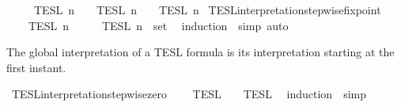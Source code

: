 \begin{isabellebody}
{\isacharbar}\ {\isacartoucheopen}{\isasymlbrakk}{\isasymlbrakk}\ {\isasymphi}\ {\isacharhash}\ {\isasymPhi}\ {\isasymrbrakk}{\isasymrbrakk}\isactrlsub T\isactrlsub E\isactrlsub S\isactrlsub L\isactrlbsup {\isasymge}\ n\isactrlesup \ {\isacharequal}\ {\isasymlbrakk}\ {\isasymphi}\ {\isasymrbrakk}\isactrlsub T\isactrlsub E\isactrlsub S\isactrlsub L\isactrlbsup {\isasymge}\ n\isactrlesup \ {\isasyminter}\ {\isasymlbrakk}{\isasymlbrakk}\ {\isasymPhi}\ {\isasymrbrakk}{\isasymrbrakk}\isactrlsub T\isactrlsub E\isactrlsub S\isactrlsub L\isactrlbsup {\isasymge}\ n\isactrlesup {\isacartoucheclose}\isanewline
\isanewline
{}\isamarkupfalse%
\ TESL{\isacharunderscore}interpretation{\isacharunderscore}stepwise{\isacharunderscore}fixpoint{\isacharcolon}\isanewline
\ \ {\isacartoucheopen}{\isasymlbrakk}{\isasymlbrakk}\ {\isasymPhi}\ {\isasymrbrakk}{\isasymrbrakk}\isactrlsub T\isactrlsub E\isactrlsub S\isactrlsub L\isactrlbsup {\isasymge}\ n\isactrlesup \ {\isacharequal}\ {\isasymInter}\ {\isacharparenleft}{\isacharparenleft}{\isasymlambda}{\isasymphi}{\isachardot}\ {\isasymlbrakk}\ {\isasymphi}\ {\isasymrbrakk}\isactrlsub T\isactrlsub E\isactrlsub S\isactrlsub L\isactrlbsup {\isasymge}\ n\isactrlesup {\isacharparenright}\ {\isacharbackquote}\ set\ {\isasymPhi}{\isacharparenright}{\isacartoucheclose}\isanewline
%
\isadelimproof
%
\endisadelimproof
%
\isatagproof
{}\isamarkupfalse%
\ {\isacharparenleft}induction\ {\isasymPhi}{\isacharcomma}\ simp{\isacharcomma}\ auto{\isacharparenright}%
\endisatagproof
{\isafoldproof}%
%
\isadelimproof
%
\endisadelimproof
%
\begin{isamarkuptext}%
The global interpretation of a TESL formula is its interpretation starting
  at the first instant.%
\end{isamarkuptext}\isamarkuptrue%
\isamarkupfalse%
\ TESL{\isacharunderscore}interpretation{\isacharunderscore}stepwise{\isacharunderscore}zero{\isacharcolon}\isanewline
\ \ {\isacartoucheopen}{\isasymlbrakk}\ {\isasymphi}\ {\isasymrbrakk}\isactrlsub T\isactrlsub E\isactrlsub S\isactrlsub L\ {\isacharequal}\ {\isasymlbrakk}\ {\isasymphi}\ {\isasymrbrakk}\isactrlsub T\isactrlsub E\isactrlsub S\isactrlsub L\isactrlbsup {\isasymge}\ {}\isactrlesup {\isacartoucheclose}\isanewline
%
\isadelimproof
%
\endisadelimproof
%
\isatagproof
{}\isamarkupfalse%
\ {\isacharparenleft}induction\ {\isasymphi}{\isacharcomma}\ simp{\isacharplus}{\isacharparenright}%
\endisatagproof
{\isafoldproof}%
%
\isadelimproof
\isanewline
%
\endisadelimproof
\isanewline
{}\isamarkupfalse%

\end{isabellebody}
